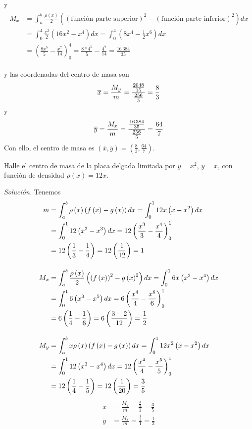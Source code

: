y
\begin{gather*}
\begin{aligned}
  M_{x}&=\int_{a}^{b}\frac{\rho \left( x\right) }{2}\left( (\text{función parte superior})^2-(\text{función parte inferior})^2\right) dx\\
  &=\int_{0}^{4}\frac{x^{2}}{2}\left( 16x^{2}-x^{4}\right)dx=\int_{0}^{4}\left( 8x^{4}-\frac{1}{2}x^{6}\right) dx\\
  &=\left( \frac{8x^{5}}{5}-\frac{x^{7}}{14}\right) _{0}^{4}=\frac{8\ast 4^{5}}{5}-\frac{4^{7}}{14}=\frac{16\,384}{35}
\end{aligned}
\end{gather*}

y las coordenadas del centro de masa son
\[
\overline{x}=\frac{M_{y}}{m}=\frac{\frac{2048}{15}}{\frac{256}{5}}=\frac{8}{%
3}
\]
y
\[
\overline{y}=\frac{M_{x}}{m}=\frac{\frac{16\,384}{35}}{\frac{256}{5}}=\frac{%
64}{7}
\]
Con ello, el centro de masa es $\left( \overline{x},\overline{y}\right) =\left( \frac{8}{3},\frac{64}{7}\right)$.

\begin{ejemplo}
Halle el centro de masa de la placa delgada limitada por $y=x^{2}$, $y=x$, con función de densidad $\rho \left( x\right) =12x$.
\end{ejemplo}

\emph{Solución.} Tenemos
\begin{align*}
m&=\int_{a}^{b}\rho \left( x\right) \left( f\left( x\right) -g\left(
x\right) \right) dx=\int_{0}^{1}12x\left( x-x^{2}\right) dx\\
&=\int_{0}^{1}12\left( x^{2}-x^{3}\right) dx=12\left( \frac{x^{3}}{3}-\frac{x^{4}}{4}\right) _{0}^{1}\\
&=12\left( \frac{1}{3}-\frac{1}{4}\right) =12\left( \frac{1}{12}\right)=1\\[1em]
M_{x}&=\int_{a}^{b}\frac{\rho \left( x\right) }{2}\left( \left( f\left(
x\right) \right) ^{2}-g\left( x\right) ^{2}\right) dx=\int_{0}^{1}6x\left(
x^{2}-x^{4}\right) dx\\
&=\int_{0}^{1}6\left( x^{3}-x^{5}\right) dx=6\left( \frac{x^{4}}{4}-\frac{%
x^{6}}{6}\right) _{0}^{1}\\
&=6\left( \frac{1}{4}-\frac{1}{6}\right) =6\left( \frac{3-2}{12}\right)
=\frac{1}{2}\\[1em]
M_{y}&=\int_{a}^{b}x\rho \left( x\right) \left( f\left( x\right) -g\left(
x\right) \right) dx=\int_{0}^{1}12x^{2}\left( x-x^{2}\right) dx\\
&=\int_{0}^{1}12\left( x^{3}-x^{4}\right) dx=12\left( \frac{x^{4}}{4}-\frac{
x^{5}}{5}\right) _{0}^{1}\\
&=12\left( \frac{1}{4}-\frac{1}{5}\right) =12\left(\frac{1}{20}\right)=\frac{3}{5}
\end{align*}
\begin{align*}
\overline{x}&=\frac{M_{y}}{m}=\frac{\frac{3}{5}}{1}=\frac{3}{5}\\
\overline{y}&=\frac{M_{x}}{m}=\frac{\frac{1}{2}}{1}=\frac{1}{2}
\end{align*}


